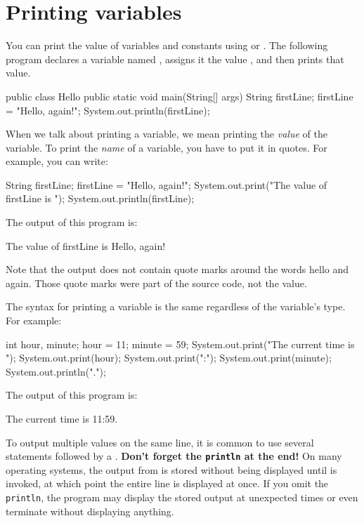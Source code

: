 \section{Printing variables}
\label{printing}

You can print the value of variables and constants using  or .
The following program declares a variable named , assigns it the value , and then prints that value.

\begin{code}
public class Hello {
    public static void main(String[] args) {
        String firstLine;
        firstLine = "Hello, again!";
        System.out.println(firstLine);
    }
}
\end{code}

When we talk about printing a variable, we mean printing the {\em value} of the variable.
To print the {\em name} of a variable, you have to put it in quotes.
For example, you can write:

\begin{code}
    String firstLine;
    firstLine = "Hello, again!";
    System.out.print("The value of firstLine is ");
    System.out.println(firstLine);
\end{code}

The output of this program is:

\begin{stdout}
The value of firstLine is Hello, again!
\end{stdout}

Note that the output does not contain quote marks around the words hello and again.
Those quote marks were part of the source code, not the value.

The syntax for printing a variable is the same regardless of the variable's type.
For example:

\begin{code}
    int hour, minute;
    hour = 11;
    minute = 59;
    System.out.print("The current time is ");
    System.out.print(hour);
    System.out.print(":");
    System.out.print(minute);
    System.out.println(".");
\end{code}

The output of this program is:

\begin{stdout}
The current time is 11:59.
\end{stdout}

To output multiple values on the same line, it is common to use several  statements followed by a .
{\bf Don't forget the {\tt println} at the end!}
On many operating systems, the output from  is stored without being displayed until  is invoked, at which point the entire line is displayed at once.
If you omit the {\tt println}, the program may display the stored output at unexpected times or even terminate without displaying anything.


